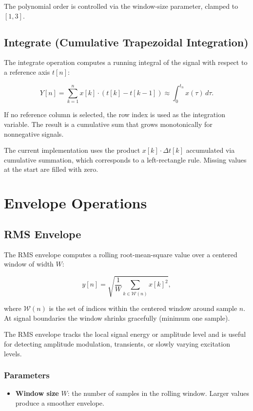 \documentclass[11pt,a4paper]{article}
\begin{document}
The polynomial order is controlled via the window-size parameter, clamped to $[1, 3]$.

\subsection{Integrate (Cumulative Trapezoidal Integration)}

The integrate operation computes a running integral of the signal with respect to a reference axis $t[n]$:

\[
Y[n] = \sum_{k=1}^{n} x[k] \cdot (t[k] - t[k-1]) \approx \int_0^{t_n} x(\tau)\,d\tau.
\]

If no reference column is selected, the row index is used as the integration variable. The result is a cumulative sum that grows monotonically for nonnegative signals.

The current implementation uses the product $x[k] \cdot \Delta t[k]$ accumulated via cumulative summation, which corresponds to a left-rectangle rule. Missing values at the start are filled with zero.

\section{Envelope Operations}

\subsection{RMS Envelope}

The RMS envelope computes a rolling root-mean-square value over a centered window of width $W$:

\[
y[n] = \sqrt{\frac{1}{W} \sum_{k \in \mathcal{W}(n)} x[k]^2},
\]

where $\mathcal{W}(n)$ is the set of indices within the centered window around sample $n$. At signal boundaries the window shrinks gracefully (minimum one sample).

The RMS envelope tracks the local signal energy or amplitude level and is useful for detecting amplitude modulation, transients, or slowly varying excitation levels.

\subsubsection{Parameters}

\begin{itemize}
    \item \textbf{Window size} $W$: the number of samples in the rolling window. Larger values produce a smoother envelope.
\end{itemize}
\end{document}
